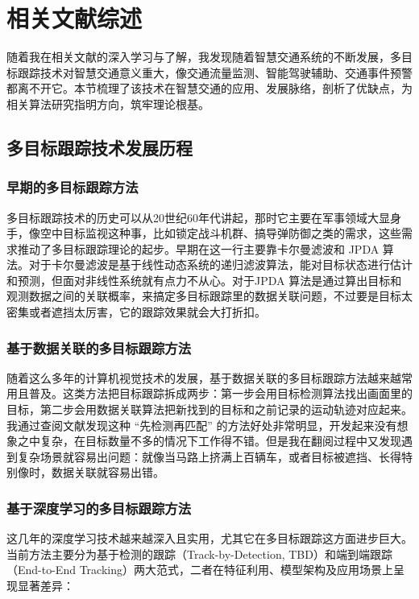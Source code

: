 \chapter{相关文献综述}

随着我在相关文献的深入学习与了解，我发现随着智慧交通系统的不断发展，多目标跟踪技术对智慧交通意义重大，像交通流量监测、智能驾驶辅助、交通事件预警都离不开它。本节梳理了该技术在智慧交通的应用、发展脉络，剖析了优缺点，为相关算法研究指明方向，筑牢理论根基。
\section{多目标跟踪技术发展历程}

\subsection{早期的多目标跟踪方法}

多目标跟踪技术的历史可以从20世纪60年代讲起，那时它主要在军事领域大显身手，像空中目标监视这种事，比如锁定战斗机群、搞导弹防御之类的需求，这些需求推动了多目标跟踪理论的起步。早期在这一行主要靠卡尔曼滤波和 JPDA 算法\cite{barshalom2012tracking}。对于卡尔曼滤波是基于线性动态系统的递归滤波算法，能对目标状态进行估计和预测，但面对非线性系统就有点力不从心。对于JPDA 算法是通过算出目标和观测数据之间的关联概率，来搞定多目标跟踪里的数据关联问题，不过要是目标太密集或者遮挡太厉害，它的跟踪效果就会大打折扣。

\subsection{基于数据关联的多目标跟踪方法}

随着这么多年的计算机视觉技术的发展，基于数据关联的多目标跟踪方法越来越常用且普及。这类方法把目标跟踪拆成两步：第一步会用目标检测算法找出画面里的目标，第二步会用数据关联算法把新找到的目标和之前记录的运动轨迹对应起来。我通过查阅文献\cite{wang2020research}发现这种 “先检测再匹配” 的方法好处非常明显，开发起来没有想象之中复杂，在目标数量不多的情况下工作得不错。但是我在翻阅过程中又发现遇到复杂场景就容易出问题：就像当马路上挤满上百辆车，或者目标被遮挡、长得特别像时，数据关联就容易出错。
\subsection{基于深度学习的多目标跟踪方法}

这几年的深度学习技术越来越深入且实用，尤其它在多目标跟踪这方面进步巨大。当前方法主要分为基于检测的跟踪（Track-by-Detection, TBD）和端到端跟踪（End-to-End Tracking）两大范式，二者在特征利用、模型架构及应用场景上呈现显著差异：

